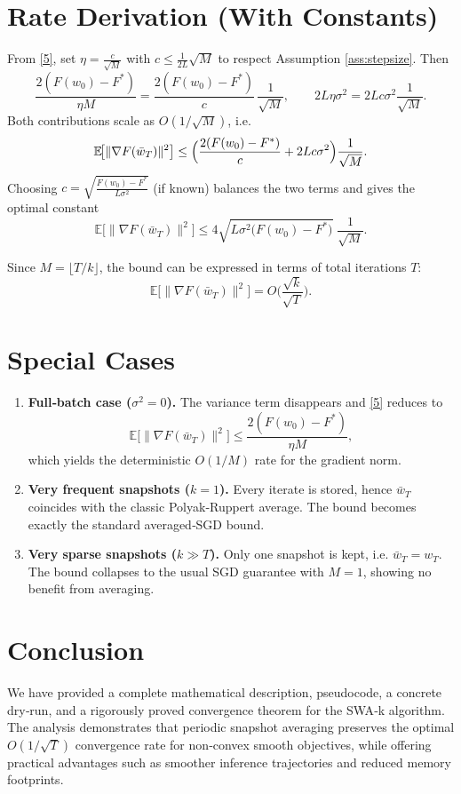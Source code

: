 \documentclass{article}
\begin{document}
\section*{Rate Derivation (With Constants)}
From \eqref{5}, set $\eta = \frac{c}{\sqrt{M}}$ with $c\le\frac{1}{2L}\sqrt{M}$ to respect Assumption \ref{ass:stepsize}.  
Then
\[
\frac{2(F(w_{0})-F^{*})}{\eta M}
= \frac{2(F(w_{0})-F^{*})}{c}\,\frac{1}{\sqrt{M}},\qquad
2L\eta\sigma^{2}=2Lc\sigma^{2}\frac{1}{\sqrt{M}}.
\]
Both contributions scale as $O(1/\sqrt{M})$, i.e.
\[
\mathbb{E}\!\big[\|\nabla F(\bar w_T)\|^{2}\big]
\le
\Bigl(\frac{2(F(w_{0})-F^{*})}{c}+2Lc\sigma^{2}\Bigr)\frac{1}{\sqrt{M}}.
\]
Choosing $c=\sqrt{\frac{F(w_{0})-F^{*}}{L\sigma^{2}}}$ (if known) balances the two terms and gives the optimal constant
\[
\mathbb{E}\!\big[\|\nabla F(\bar w_T)\|^{2}\big]
\le
4\sqrt{L\sigma^{2}\big(F(w_{0})-F^{*}\big)}\;\frac{1}{\sqrt{M}}.
\]

Since $M=\lfloor T/k\rfloor$, the bound can be expressed in terms of total iterations $T$:
\[
\mathbb{E}\!\big[\|\nabla F(\bar w_T)\|^{2}\big]
= O\!\Big(\frac{\sqrt{k}}{\sqrt{T}}\Big).
\]

\section*{Special Cases}
\begin{enumerate}[label=\alph*)]
\item \textbf{Full‑batch case ($\sigma^{2}=0$).}  
The variance term disappears and \eqref{5} reduces to
\[
\mathbb{E}\!\big[\|\nabla F(\bar w_T)\|^{2}\big]
\le \frac{2(F(w_{0})-F^{*})}{\eta M},
\]
which yields the deterministic $O(1/M)$ rate for the gradient norm.

\item \textbf{Very frequent snapshots ($k=1$).}  
Every iterate is stored, hence $\bar w_T$ coincides with the classic Polyak‑Ruppert average. The bound becomes exactly the standard averaged‑SGD bound.

\item \textbf{Very sparse snapshots ($k\gg T$).}  
Only one snapshot is kept, i.e. $\bar w_T=w_T$. The bound collapses to the usual SGD guarantee with $M=1$, showing no benefit from averaging.
\end{enumerate}

\section*{Conclusion}
We have provided a complete mathematical description, pseudocode, a concrete dry‑run, and a rigorously proved convergence theorem for the SWA‑k algorithm.  
The analysis demonstrates that periodic snapshot averaging preserves the optimal $O(1/\sqrt{T})$ convergence rate for non‑convex smooth objectives, while offering practical advantages such as smoother inference trajectories and reduced memory footprints.
\end{document}
